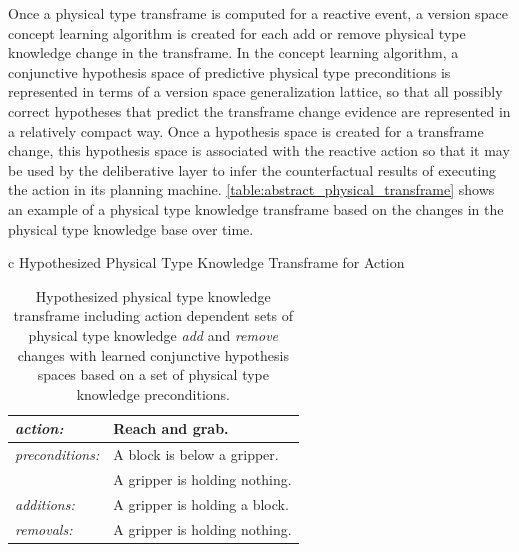 Once a physical type transframe is computed for a reactive event, a
version space concept learning algorithm \cite[]{mitchell:1997} is
created for each add or remove physical type knowledge change in the
transframe.  In the concept learning algorithm, a conjunctive
hypothesis space of predictive physical type preconditions is
represented in terms of a version space generalization lattice, so
that all possibly correct hypotheses that predict the transframe
change evidence are represented in a relatively compact way.  Once a
hypothesis space is created for a transframe change, this hypothesis
space is associated with the reactive action so that it may be used by
the deliberative layer to infer the counterfactual results of
executing the action in its planning machine.
{\mbox{\autoref{table:abstract_physical_transframe}}} shows an example
of a physical type knowledge transframe based on the changes in the
physical type knowledge base over time.
\begin{table}[h]
\centering
\begin{tabular}{c}
  Hypothesized Physical Type Knowledge Transframe for Action \\
  \begin{tabular}{|l|l|}
    \hline
    \emph{action:}        & Reach and grab. \\
    \hline
    \emph{preconditions:} & A block is below a gripper. \\
    ~                     & A gripper is holding nothing. \\
    \hline
    \emph{additions:}     & A gripper is holding a block. \\
    \hline
    \emph{removals:}      & A gripper is holding nothing. \\
    \hline
  \end{tabular}
\end{tabular}
\caption[Hypothesized physical type knowledge transframe for
  action.]{Hypothesized physical type knowledge transframe including
  action dependent sets of physical type knowledge \emph{add} and
  \emph{remove} changes with learned conjunctive hypothesis spaces
  based on a set of physical type knowledge preconditions.}
\label{table:abstract_physical_transframe}
\end{table}

